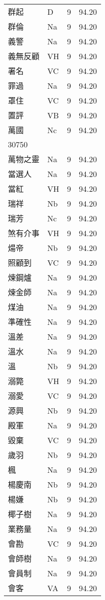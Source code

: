 \documentclass[twocolumn]{book}
\begin{document}
\begin{supertabular}{llrr}
群起 & D & 9 &  94.20\\
群倫 & Na & 9 &  94.20\\
義警 & Na & 9 &  94.20\\
義無反顧 & VH & 9 &  94.20\\
署名 & VC & 9 &  94.20\\
罪過 & Na & 9 &  94.20\\
罩住 & VC & 9 &  94.20\\
置評 & VB & 9 &  94.20\\
萬國 & Nc & 9 &  94.20\\
30750\\
萬物之靈 & Na & 9 &  94.20\\
當選人 & Na & 9 &  94.20\\
當紅 & VH & 9 &  94.20\\
瑞祥 & Nb & 9 &  94.20\\
瑞芳 & Nc & 9 &  94.20\\
煞有介事 & VH & 9 &  94.20\\
煬帝 & Nb & 9 &  94.20\\
照顧到 & VC & 9 &  94.20\\
煉鋼爐 & Na & 9 &  94.20\\
煉金師 & Na & 9 &  94.20\\
煤油 & Na & 9 &  94.20\\
準確性 & Na & 9 &  94.20\\
溫差 & Na & 9 &  94.20\\
溫水 & Na & 9 &  94.20\\
溫 & Nb & 9 &  94.20\\
溺斃 & VH & 9 &  94.20\\
溺愛 & VC & 9 &  94.20\\
源興 & Nb & 9 &  94.20\\
殿軍 & Na & 9 &  94.20\\
毀棄 & VC & 9 &  94.20\\
歲羽 & Nb & 9 &  94.20\\
楓 & Na & 9 &  94.20\\
楊慶南 & Nb & 9 &  94.20\\
楊嫌 & Nb & 9 &  94.20\\
椰子樹 & Na & 9 &  94.20\\
業務量 & Na & 9 &  94.20\\
會勘 & VC & 9 &  94.20\\
會師樹 & Na & 9 &  94.20\\
會員制 & Na & 9 &  94.20\\
會客 & VA & 9 &  94.20\\

\end{supertabular}
\end{document}
